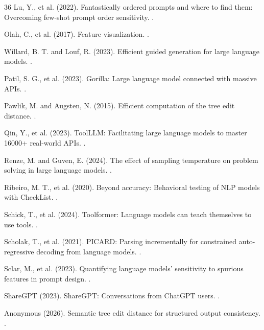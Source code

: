 \documentclass[sigconf,anonymous,review]{acmart}
\begin{document}
\begin{thebibliography}{36}
Lu, Y., et al. (2022).
\newblock Fantastically ordered prompts and where to find them: Overcoming few-shot prompt order sensitivity.
.

Olah, C., et al. (2017).
\newblock Feature visualization.
.

Willard, B. T. and Louf, R. (2023).
\newblock Efficient guided generation for large language models.
.

Patil, S. G., et al. (2023).
\newblock Gorilla: Large language model connected with massive APIs.
.

Pawlik, M. and Augsten, N. (2015).
\newblock Efficient computation of the tree edit distance.
.

Qin, Y., et al. (2023).
\newblock ToolLLM: Facilitating large language models to master 16000+ real-world APIs.
.

Renze, M. and Guven, E. (2024).
\newblock The effect of sampling temperature on problem solving in large language models.
.

Ribeiro, M. T., et al. (2020).
\newblock Beyond accuracy: Behavioral testing of NLP models with CheckList.
.

Schick, T., et al. (2024).
\newblock Toolformer: Language models can teach themselves to use tools.
.

Scholak, T., et al. (2021).
\newblock PICARD: Parsing incrementally for constrained auto-regressive decoding from language models.
.

Sclar, M., et al. (2023).
\newblock Quantifying language models' sensitivity to spurious features in prompt design.
.

ShareGPT (2023).
\newblock ShareGPT: Conversations from ChatGPT users.
.

Anonymous (2026).
\newblock Semantic tree edit distance for structured output consistency.
.


\end{thebibliography}
\end{document}
